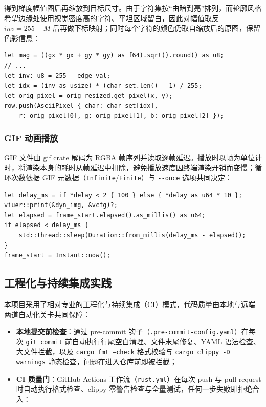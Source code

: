 \documentclass{SYSUReport}
\begin{document}
得到梯度幅值图后再缩放到目标尺寸。由于字符集按``由暗到亮''排列，而轮廓风格希望边缘处使用视觉密度高的字符、平坦区域留白，因此对幅值取反 $inv = 255 - M$ 后再做下标映射；同时每个字符的颜色仍取自缩放后的原图，保留色彩信息：

\begin{lstlisting}[caption={Sobel 幅值计算与反转映射（ascii/sobel.rs）}]
let mag = ((gx * gx + gy * gy) as f64).sqrt().round() as u8;
// ...
let inv: u8 = 255 - edge_val;
let idx = (inv as usize) * (char_set.len() - 1) / 255;
let orig_pixel = orig_resized.get_pixel(x, y);
row.push(AsciiPixel { char: char_set[idx],
    r: orig_pixel[0], g: orig_pixel[1], b: orig_pixel[2] });
\end{lstlisting}

\subsubsection{GIF 动画播放}

GIF 文件由 gif crate 解码为 RGBA 帧序列并读取逐帧延迟。播放时以帧为单位计时，将渲染本身的耗时从帧延迟中扣除，避免播放速度因终端渲染开销而变慢；循环次数依据 GIF 元数据（\texttt{Infinite}/\texttt{Finite}）与 \verb|--once| 选项共同决定：

\begin{lstlisting}[caption={帧延迟补偿（app.rs）}]
let delay_ms = if *delay < 2 { 100 } else { *delay as u64 * 10 };
viuer::print(&dyn_img, &vcfg)?;
let elapsed = frame_start.elapsed().as_millis() as u64;
if elapsed < delay_ms {
    std::thread::sleep(Duration::from_millis(delay_ms - elapsed));
}
frame_start = Instant::now();
\end{lstlisting}

\subsection{工程化与持续集成实践}

本项目采用了相对专业的工程化与持续集成（CI）模式，代码质量由本地与远端两道自动化关卡共同保障：

\begin{itemize}
    \item \textbf{本地提交前检查}：通过 pre-commit 钩子（\texttt{.pre-commit-config.yaml}）在每次 \texttt{git commit} 前自动执行行尾空白清理、文件末尾修复、YAML 语法检查、大文件拦截，以及 \texttt{cargo fmt --check} 格式校验与 \texttt{cargo clippy -D warnings} 静态检查，问题在进入仓库前即被拦截；
    \item \textbf{CI 质量门}：GitHub Actions 工作流（\texttt{rust.yml}）在每次 push 与 pull request 时自动执行格式检查、clippy 零警告检查与全量测试，任何一步失败即拒绝合入：
\end{itemize}
\end{document}
